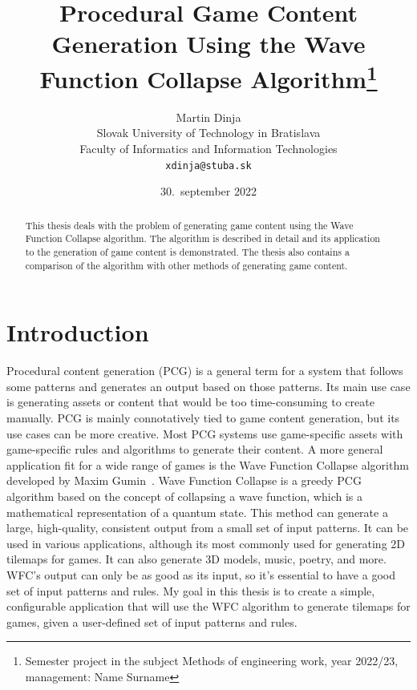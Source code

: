 \documentclass[10pt,oneside,a4paper]{article}
\title{Procedural Game Content Generation Using the Wave Function Collapse Algorithm\thanks{Semester project in the subject Methods of engineering work, year 2022/23, management: Name Surname}}
\author{Martin Dinja\\[2pt]
	{\small Slovak University of Technology in Bratislava}\\
	{\small Faculty of Informatics and Information Technologies}\\
	{\small \texttt{xdinja@stuba.sk}}
}
\date{\small 30.\ september 2022}
\begin{document}
\maketitle


\begin{abstract}
    \begin{center}
        This thesis deals with the problem of generating game content using the Wave Function Collapse algorithm. The algorithm is described in detail and its application to the generation of game content is demonstrated. The thesis also contains a comparison of the algorithm with other methods of generating game content.
    \end{center}
\end{abstract}

\section{Introduction}\label{sec:introduction}

Procedural content generation (PCG) is a general term for a system that follows some patterns and generates an output based on those patterns.
Its main use case is generating assets or content that would be too time-consuming to create manually.
PCG is mainly connotatively tied to game content generation, but its use cases can be more creative.
Most PCG systems use game-specific assets with game-specific rules and algorithms to generate their content.
A more general application fit for a wide range of games is the Wave Function Collapse algorithm developed by Maxim Gumin~\cite{WFC}.
Wave Function Collapse is a greedy PCG algorithm based on the concept of collapsing a wave function, which is a mathematical representation of a quantum state.
This method can generate a large, high-quality, consistent output from a small set of input patterns.
It can be used in various applications, although its most commonly used for generating 2D tilemaps for games.
It can also generate 3D models, music, poetry, and more.
WFC's output can only be as good as its input, so it's essential to have a good set of input patterns and rules. 
My goal in this thesis is to create a simple, configurable application that will use the WFC algorithm to generate tilemaps for games, given a user-defined set of input patterns and rules.
\end{document}
